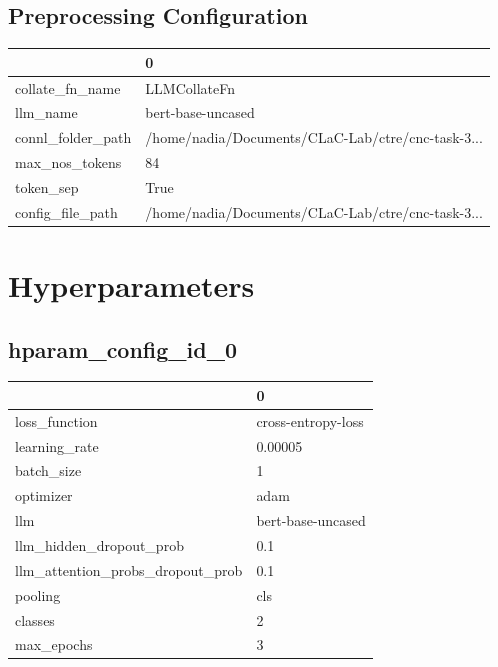 \documentclass{article}
\begin{document}
\subsection{Preprocessing Configuration}
\begin{tabular}{ll}
\toprule
{} &                                                  0 \\
\midrule
collate\_fn\_name   &                                       LLMCollateFn \\
llm\_name          &                                  bert-base-uncased \\
connl\_folder\_path &  /home/nadia/Documents/CLaC-Lab/ctre/cnc-task-3... \\
max\_nos\_tokens    &                                                 84 \\
token\_sep         &                                               True \\
config\_file\_path  &  /home/nadia/Documents/CLaC-Lab/ctre/cnc-task-3... \\
\bottomrule
\end{tabular}

\section{Hyperparameters}
\subsection{hparam\_config\_id\_0}
\begin{tabular}{ll}
\toprule
{} &                   0 \\
\midrule
loss\_function                    &  cross-entropy-loss \\
learning\_rate                    &             0.00005 \\
batch\_size                       &                   1 \\
optimizer                        &                adam \\
llm                              &   bert-base-uncased \\
llm\_hidden\_dropout\_prob          &                 0.1 \\
llm\_attention\_probs\_dropout\_prob &                 0.1 \\
pooling                          &                 cls \\
classes                          &                   2 \\
max\_epochs                       &                   3 \\
\bottomrule
\end{tabular}
\end{document}
